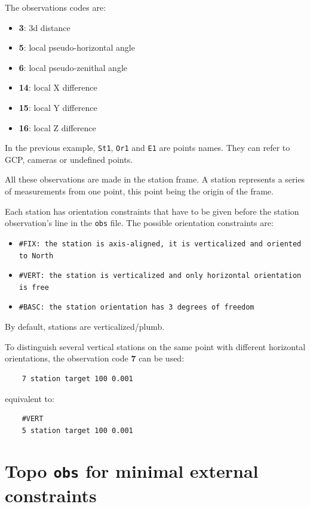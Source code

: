 The observations codes are:

\begin{itemize}
    \item \textbf{3}: 3d distance
    \item \textbf{5}: local pseudo-horizontal angle
    \item \textbf{6}: local pseudo-zenithal angle
    \item \textbf{14}: local X difference
    \item \textbf{15}: local Y difference
    \item \textbf{16}: local Z difference
\end{itemize}

In the previous example, {\tt St1}, {\tt Or1} and {\tt E1} are points names.
They can refer to GCP, cameras or undefined points.

All these observations are made in the station frame. A station represents a series of measurements from one point, this point being the origin of the frame.

Each station has orientation constraints that have to be given before the station observation's line in the {\tt {obs}} file.
The possible orientation constraints are:
\begin{itemize}
   \item \tt{\#FIX}: the station is axis-aligned, it is verticalized and oriented to North
   \item \tt{\#VERT}: the station is verticalized and only horizontal orientation is free
   \item \tt{\#BASC}: the station orientation has 3 degrees of freedom
\end{itemize}

By default, stations are verticalized/plumb.

To distinguish several vertical stations on the same point with different horizontal orientations, the observation code {\textbf 7} can be used:

\begin{verbatim}
    7 station target 100 0.001
\end{verbatim}

equivalent to:

\begin{verbatim}
    #VERT
    5 station target 100 0.001
\end{verbatim}


\section{Topo \texttt{obs} for minimal external constraints}

